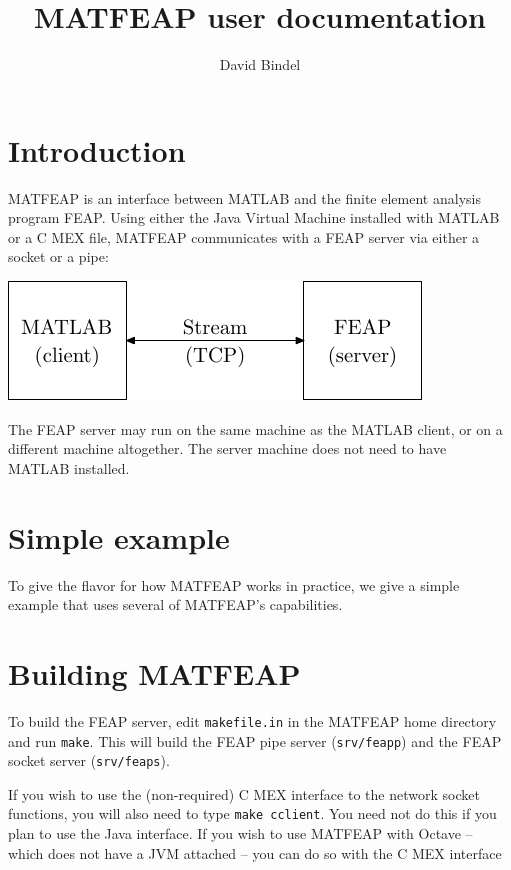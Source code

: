 \documentclass[12pt]{article}
\title{MATFEAP user documentation}
\author{David Bindel}
\begin{document}
\maketitle

\section{Introduction}

MATFEAP is an interface between MATLAB and the finite element analysis
program FEAP.  Using either the Java Virtual Machine installed with MATLAB
or a C MEX file, MATFEAP communicates with a FEAP server via either a socket
or a pipe:
\begin{center}
  \includegraphics{commfig}
\end{center}

The FEAP server may run on the same machine as the MATLAB client,
or on a different machine altogether.  The server machine does not
need to have MATLAB installed.


\section{Simple example}

To give the flavor for how MATFEAP works in practice, we give a simple
example that uses several of MATFEAP's capabilities.




\section{Building MATFEAP}

To build the FEAP server, edit {\tt makefile.in} in the MATFEAP home
directory and run {\tt make}.  This will build the FEAP pipe server
({\tt srv/feapp}) and the FEAP socket server ({\tt srv/feaps}).

If you wish to use the (non-required) C MEX interface to the network
socket functions, you will also need to type {\tt make cclient}.  You
need not do this if you plan to use the Java interface.  If you wish
to use MATFEAP with Octave -- which does not have a JVM attached --
you can do so with the C MEX interface
\end{document}
